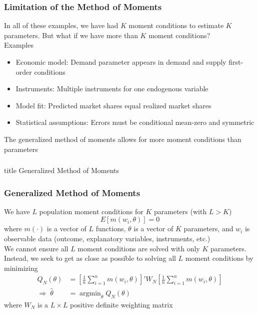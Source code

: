 \documentclass{beamer}
\DeclareMathOperator*{\argmin}{argmin}
\begin{document}
\begin{frame}\frametitle{Limitation of the Method of Moments}
    In all of these examples, we have had $K$ moment conditions to estimate $K$ parameters. But what if we have more than $K$ moment conditions? \\
    \vspace{3ex}
    Examples
    \begin{itemize}
    	\item Economic model: Demand parameter appears in demand and supply first-order conditions
    	\item Instruments: Multiple instruments for one endogenous variable
    	\item Model fit: Predicted market shares equal realized market shares
    	\item Statistical assumptions: Errors must be conditional mean-zero and symmetric
    \end{itemize}
    \vspace{3ex}
    The generalized method of moments allows for more moment conditions than parameters
\end{frame}

\begin{frame}\frametitle{}
    \vfill
    \centering
    \begin{beamercolorbox}[center]{title}
        \Large Generalized Method of Moments
    \end{beamercolorbox}
    \vfill
\end{frame}

\begin{frame}\frametitle{Generalized Method of Moments}
    We have $L$ population moment conditions for $K$ parameters (with $L > K$)
    $$E[m(w_i, \theta)] = 0$$
    where $m(\cdot)$ is a vector of $L$ functions, $\theta$ is a vector of $K$ parameters, and $w_i$ is observable data (outcome, explanatory variables, instruments, etc.) \\
    \vspace{2ex}
    We cannot ensure all $L$ moment conditions are solved with only $K$ parameters. Instead, we seek to get as close as possible to solving all $L$ moment conditions by minimizing
    \begin{align*}
    	Q_N(\theta) &= \left[ \frac{1}{n} \sum_{i = 1}^n m(w_i, \theta) \right]' W_N \left[ \frac{1}{n} \sum_{i = 1}^n m(w_i, \theta) \right] \\
    	\Rightarrow \; \hat{\theta} &= \argmin_{\theta} Q_N(\theta)
    \end{align*}
    where $W_N$ is a $L \times L$ positive definite weighting matrix 
\end{frame}
\end{document}
